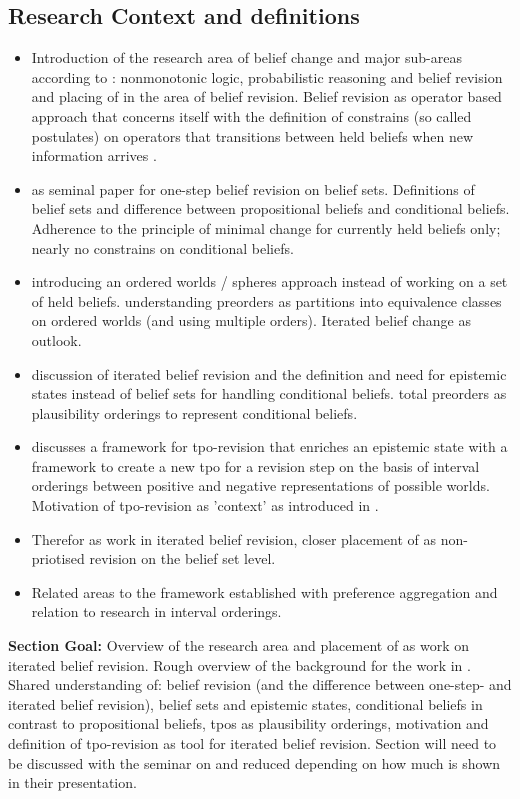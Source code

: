 \documentclass[11pt]{article}
\begin{document}
\subsection{Research Context and definitions}
\begin{itemize}
    \item Introduction of the research area of belief change and major sub-areas according to \cite{Darwiche1997}: nonmonotonic logic, probabilistic reasoning and belief revision and placing of \cite{Booth2011} in the area of belief revision. Belief revision as operator based approach that concerns itself with the definition of constrains (so called postulates) on operators that transitions between held beliefs when new information arrives \cite{Darwiche1997}.
    \item \cite{Alchourron1985} as seminal paper for one-step belief revision on belief sets. Definitions of belief sets and difference between propositional beliefs and conditional beliefs. Adherence to the principle of minimal change for currently held beliefs only; nearly no constrains on conditional beliefs.
    \item \cite{Grove1988} introducing an ordered worlds / spheres approach instead of working on a set of held beliefs. \cite{Booth2004} understanding preorders as partitions into equivalence classes on ordered worlds (and using multiple orders). Iterated belief change as outlook.
    \item \cite{Darwiche1997} discussion of \gls{iterated belief revision} and the definition and need for epistemic states instead of belief sets for handling conditional beliefs. \Gls{total preorder}s as plausibility orderings to represent conditional beliefs.
    \item \cite{Booth2011} discusses a framework for tpo-revision that enriches an epistemic state with a framework to create a new tpo for a revision step on the basis of interval orderings between positive and negative representations of possible worlds. Motivation of tpo-revision as 'context' as introduced in \cite{Booth2007}.
    \item Therefor \cite{Booth2011} as work in iterated belief revision, closer placement of \cite{Booth2011} as \gls{non-priotised revision} on the belief set level.
    \item Related areas to the framework established \cite{Booth2011} with preference aggregation and relation to research in interval orderings.
\end{itemize}
\textbf{Section Goal:} Overview of the research area and placement of \cite{Booth2011} as work on iterated belief revision. Rough overview of the background for the work in \cite{Booth2011}. Shared understanding of: belief revision (and the difference between one-step- and iterated belief revision), belief sets and epistemic states, conditional beliefs in contrast to propositional beliefs, tpos as plausibility orderings, motivation and definition of tpo-revision as tool for iterated belief revision. Section will need to be discussed with the seminar on \cite{Darwiche1997} and reduced depending on how much is shown in their presentation.
\end{document}
